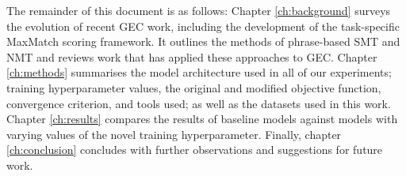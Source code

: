 The remainder of this document is as follows: Chapter \ref{ch:background} surveys the evolution of recent GEC work, including the development of the task-specific MaxMatch scoring framework. It outlines the methods of phrase-based SMT and NMT and reviews work that has applied these approaches to GEC. Chapter \ref{ch:methods} summarises the model architecture used in all of our experiments; training hyperparameter values, the original and modified objective function, convergence criterion, and tools used; as well as the datasets used in this work. Chapter \ref{ch:results} compares the results of baseline models against models with varying values of the novel training hyperparameter. Finally, chapter \ref{ch:conclusion} concludes with further observations and suggestions for future work.
